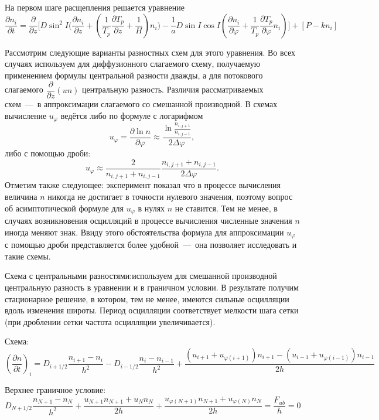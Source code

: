 \documentclass[2pt, a4paper, fleqn]{extarticle}
\begin{document}
На первом шаге расщепления решается уравнение $$\dfrac{\partial n_i}{\partial t} = \dfrac{\partial}{\partial z}\bigg[D\sin^2 I \bigg(\dfrac{\partial n_i}{\partial z}+\left(\dfrac{1}{T_p}\dfrac{\partial T_p}{\partial z}+\dfrac{1}{H}\right)n_i\bigg)-\dfrac{1}{a}D\sin I\cos I\left(\dfrac{\partial n_i}{\partial\varphi}+\dfrac{1}{T_p}\dfrac{\partial T_p}{\partial \varphi}n_i\right)\bigg]+[P-kn_i]$$

Рассмотрим следующие варианты разностных схем для этого уравнения. Во всех случаях используем для диффузионного слагаемого схему, получаемую применением формулы центральной разности дважды, а для потокового слагаемого $\dfrac{\partial}{\partial z} (un)$ центральную разность. Различия рассматриваемых схем~---~в аппроксимации слагаемого со смешанной производной. В схемах вычисление $u_\varphi$ ведётся либо по формуле с логарифмом $$u_\varphi = \dfrac{\partial \ln n}{\partial\varphi}\approx \dfrac{\ln\frac{n_{i, j+1}}{n_{i, j-1}}}{2\Delta\varphi},$$ либо с помощью дроби: $$u_\varphi \approx \dfrac{2}{n_{i, j+1}+n_{i, j-1}}\dfrac{n_{i, j+1}+n_{i, j-1}}{2\Delta\varphi}.$$ Отметим также следующее: эксперимент показал что в процессе вычисления величина $n$ никогда не достигает в точности нулевого значения, поэтому вопрос об асимптотической формуле для $u_\varphi$ в нулях $n$ не ставится. Тем не менее, в случаях возникновения осцилляций в процессе вычисления численные значения $n$ иногда меняют знак. Ввиду этого обстоятельства формула для аппроксимации $u_\varphi$ с помощью дроби представляется более удобной~---~она позволяет исследовать и такие схемы.

\medskip

 Схема с центральными разностями:используем для смешанной производной центральную разность в уравнении и в граничном условии. В результате получим стационарное решение, в котором, тем не менее, имеются сильные осцилляции вдоль изменения широты. Период осцилляции соответствует мелкости шага сетки (при дроблении сетки частота осцилляции увеличивается).

Схема: $$\left(\dfrac{\partial n}{\partial t}\right)_i = D_{i+1/2}\dfrac{n_{i+1}-n_i}{h^2} - D_{i-1/2}\dfrac{n_{i}-n_{i-1}}{h^2}+\dfrac{(u_{i+1}+u_{\varphi(i+1)})n_{i+1}-(u_{i-1}+u_{\varphi(i-1)})n_{i-1}}{2h}$$

Верхнее граничное условие: $$D_{N+1/2}\dfrac{n_{N+1}-n_{N}}{h^2}+\dfrac{u_{N+1}n_{N+1}+u_{N}n_{N}}{2h}+\dfrac{u_{\varphi(N+1)}n_{N+1}+u_{\varphi(N)}n_{N}}{2h} = \dfrac{F_{ub}}{h} = 0$$

\medskip
\end{document}
